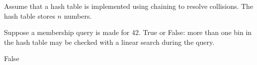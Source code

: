 \begin{prob}

    Assume that a hash table is implemented using chaining to resolve
    collisions. The hash table stores $n$ numbers.

    Suppose a membership query is made for 42. True or False: more than one bin
    in the hash table may be checked with a linear search during the query.

    \tF{}

    \begin{soln}
        False
    \end{soln}

\end{prob}
